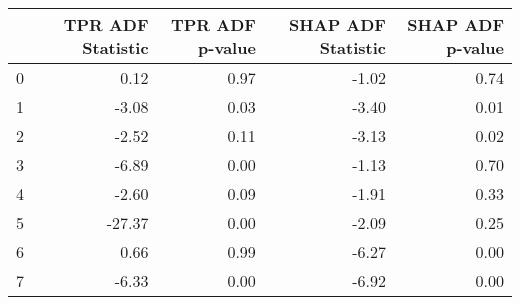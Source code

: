 \begin{tabular}{lrrrr}
\toprule
 & TPR ADF Statistic & TPR ADF p-value & SHAP ADF Statistic & SHAP ADF p-value \\
\midrule
0 & 0.12 & 0.97 & -1.02 & 0.74 \\
1 & -3.08 & 0.03 & -3.40 & 0.01 \\
2 & -2.52 & 0.11 & -3.13 & 0.02 \\
3 & -6.89 & 0.00 & -1.13 & 0.70 \\
4 & -2.60 & 0.09 & -1.91 & 0.33 \\
5 & -27.37 & 0.00 & -2.09 & 0.25 \\
6 & 0.66 & 0.99 & -6.27 & 0.00 \\
7 & -6.33 & 0.00 & -6.92 & 0.00 \\
\bottomrule
\end{tabular}

